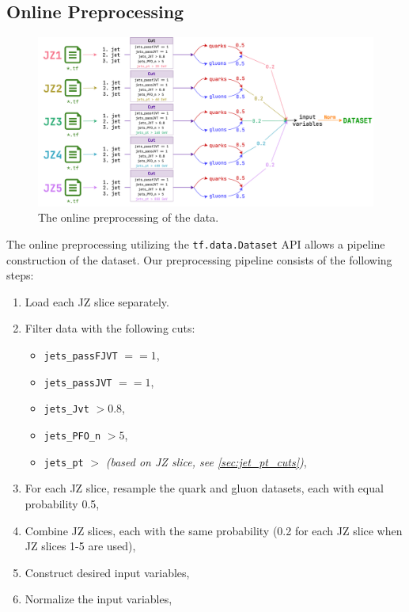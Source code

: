 \subsection{Online Preprocessing}
\label{sec:online_preprocess}
\begin{figure}[!ht]
    \centering
    \includegraphics[width=1.\textwidth]{src/diagrams/data_prep_on.png}
    \caption{The online preprocessing of the data.}
    \label{fig:data_prep_on}
\end{figure}
The online preprocessing utilizing the \texttt{tf.data.Dataset} API allows a pipeline construction of the dataset.
Our preprocessing pipeline consists of the following steps:
\begin{enumerate}
    \item Load each JZ slice separately.
    \item Filter data with the following cuts:
    \begin{itemize}
        \item \texttt{jets\_passFJVT} $== 1$,
        \item \texttt{jets\_passJVT} $== 1$,
        \item \texttt{jets\_Jvt} $> 0.8$,
        \item \texttt{jets\_PFO\_n} $> 5$,
        \item \texttt{jets\_pt} $>$ \textit{(based on JZ slice, see \cref{sec:jet_pt_cuts})},
    \end{itemize}
    \item For each JZ slice, resample the quark and gluon datasets, each with equal probability 0.5,  
    \item Combine JZ slices, each with the same probability (0.2 for each JZ slice when JZ slices 1-5 are used),
    \item Construct desired input variables,
    \item Normalize the input variables,
\end{enumerate}

